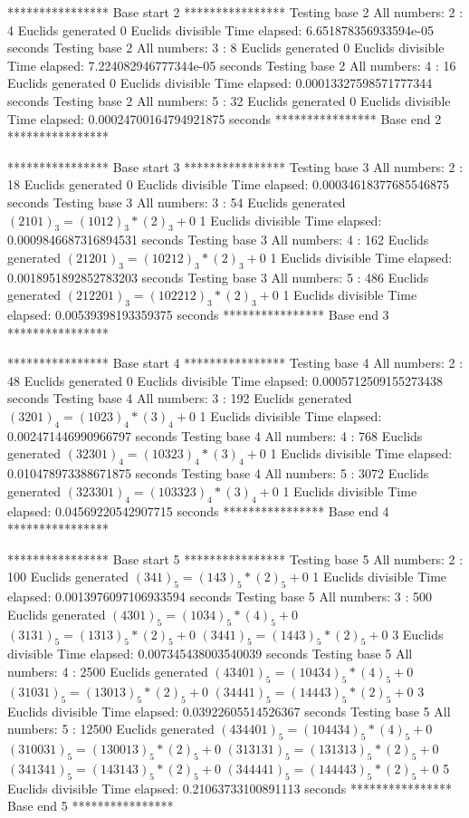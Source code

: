 **************** Base start 2 ****************
Testing base 2 All numbers: 2 :
	 4 Euclids generated
	 0 Euclids divisible
Time elapsed: 6.651878356933594e-05 seconds
Testing base 2 All numbers: 3 :
	 8 Euclids generated
	 0 Euclids divisible
Time elapsed: 7.224082946777344e-05 seconds
Testing base 2 All numbers: 4 :
	 16 Euclids generated
	 0 Euclids divisible
Time elapsed: 0.00013327598571777344 seconds
Testing base 2 All numbers: 5 :
	 32 Euclids generated
	 0 Euclids divisible
Time elapsed: 0.00024700164794921875 seconds
**************** Base end 2 ****************

**************** Base start 3 ****************
Testing base 3 All numbers: 2 :
	 18 Euclids generated
	 0 Euclids divisible
Time elapsed: 0.00034618377685546875 seconds
Testing base 3 All numbers: 3 :
	 54 Euclids generated
	$(2101)_{3}=(1012)_{3}*(2)_{3}+0$
	 1 Euclids divisible
Time elapsed: 0.0009846687316894531 seconds
Testing base 3 All numbers: 4 :
	 162 Euclids generated
	$(21201)_{3}=(10212)_{3}*(2)_{3}+0$
	 1 Euclids divisible
Time elapsed: 0.0018951892852783203 seconds
Testing base 3 All numbers: 5 :
	 486 Euclids generated
	$(212201)_{3}=(102212)_{3}*(2)_{3}+0$
	 1 Euclids divisible
Time elapsed: 0.00539398193359375 seconds
**************** Base end 3 ****************

**************** Base start 4 ****************
Testing base 4 All numbers: 2 :
	 48 Euclids generated
	 0 Euclids divisible
Time elapsed: 0.0005712509155273438 seconds
Testing base 4 All numbers: 3 :
	 192 Euclids generated
	$(3201)_{4}=(1023)_{4}*(3)_{4}+0$
	 1 Euclids divisible
Time elapsed: 0.002471446990966797 seconds
Testing base 4 All numbers: 4 :
	 768 Euclids generated
	$(32301)_{4}=(10323)_{4}*(3)_{4}+0$
	 1 Euclids divisible
Time elapsed: 0.010478973388671875 seconds
Testing base 4 All numbers: 5 :
	 3072 Euclids generated
	$(323301)_{4}=(103323)_{4}*(3)_{4}+0$
	 1 Euclids divisible
Time elapsed: 0.04569220542907715 seconds
**************** Base end 4 ****************

**************** Base start 5 ****************
Testing base 5 All numbers: 2 :
	 100 Euclids generated
	$(341)_{5}=(143)_{5}*(2)_{5}+0$
	 1 Euclids divisible
Time elapsed: 0.0013976097106933594 seconds
Testing base 5 All numbers: 3 :
	 500 Euclids generated
	$(4301)_{5}=(1034)_{5}*(4)_{5}+0$
	$(3131)_{5}=(1313)_{5}*(2)_{5}+0$
	$(3441)_{5}=(1443)_{5}*(2)_{5}+0$
	 3 Euclids divisible
Time elapsed: 0.007345438003540039 seconds
Testing base 5 All numbers: 4 :
	 2500 Euclids generated
	$(43401)_{5}=(10434)_{5}*(4)_{5}+0$
	$(31031)_{5}=(13013)_{5}*(2)_{5}+0$
	$(34441)_{5}=(14443)_{5}*(2)_{5}+0$
	 3 Euclids divisible
Time elapsed: 0.03922605514526367 seconds
Testing base 5 All numbers: 5 :
	 12500 Euclids generated
	$(434401)_{5}=(104434)_{5}*(4)_{5}+0$
	$(310031)_{5}=(130013)_{5}*(2)_{5}+0$
	$(313131)_{5}=(131313)_{5}*(2)_{5}+0$
	$(341341)_{5}=(143143)_{5}*(2)_{5}+0$
	$(344441)_{5}=(144443)_{5}*(2)_{5}+0$
	 5 Euclids divisible
Time elapsed: 0.21063733100891113 seconds
**************** Base end 5 ****************

